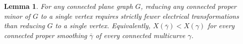 \documentclass[11pt,twoside]{article}
\def\arcto{\mathord\shortrightarrow}
\def\arc#1#2{#1\arcto#2}
\let\EDIT\relax
\newtheorem{lemma}[theorem]{Lemma}
\numberwithin{figure}{section}
\begin{document}

  
\begin{lemma}
\label{L:smoothing}
For any connected plane graph $G$, reducing any connected proper minor of $G$ to a single vertex requires strictly fewer \EDIT{facial} electrical transformations than reducing $G$ to a single vertex.
Equivalently, $X(\overline{γ}) < X(γ)$ for every connected proper smoothing $\overline{γ}$ of every connected multicurve $γ$.
\end{lemma}
\end{document}

